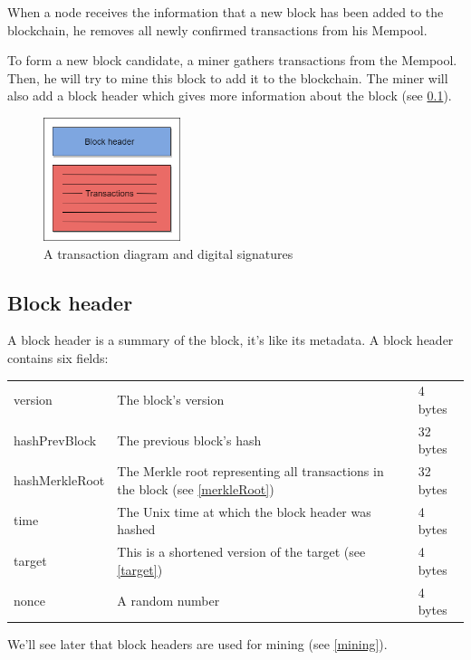 When a node receives the information that a new block has been added to the blockchain, he removes all newly confirmed transactions from his Mempool.  \newline

To form a new block candidate, a miner gathers transactions from the Mempool. Then, he will try to mine this block to add it to the blockchain. The miner will also add a block header which gives more information about the block (see \ref{blockHeader}). \newline

\begin{figure}[h]
\centering
\includegraphics[width=4cm]{Figures/block}
\caption{A transaction diagram and digital signatures}
\end{figure}


  \subsection{Block header} \label{blockHeader}

A block header is a summary of the block, it's like its metadata. A block header contains six fields: \newline

\begin{tabular}{lll}
   version & The block's version & 4 bytes\\
   hashPrevBlock & The previous block's hash & 32 bytes \\
   hashMerkleRoot & The Merkle root representing all transactions in the block (see \ref{merkleRoot}) & 32 bytes \\
   time & The Unix time at which the block header was hashed & 4 bytes \\
   target & This is a shortened version of the target (see \ref{target}) & 4 bytes \\
   nonce & A random number  & 4 bytes \\
\end{tabular}

We'll see later that block headers are used for mining (see \ref{mining}).


